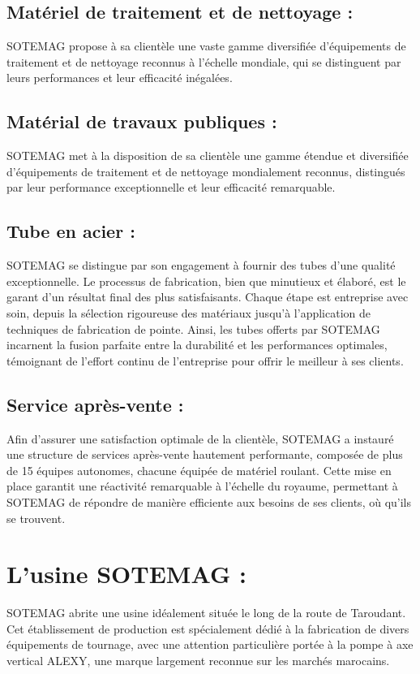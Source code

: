 \documentclass[a4paper, 11pt, openany]{report}
\begin{document}
\subsection{Matériel de traitement et de nettoyage :}
SOTEMAG propose à sa clientèle une vaste gamme diversifiée d'équipements de traitement et de nettoyage reconnus à l'échelle mondiale, qui se distinguent par leurs performances et leur efficacité inégalées.

\subsection{Matérial de travaux publiques :}
SOTEMAG met à la disposition de sa clientèle une gamme étendue et diversifiée d'équipements de traitement et de nettoyage mondialement reconnus, distingués par leur performance exceptionnelle et leur efficacité remarquable.

\subsection{Tube en acier :}
SOTEMAG se distingue par son engagement à fournir des tubes d'une qualité exceptionnelle. Le processus de fabrication, bien que minutieux et élaboré, est le garant d'un résultat final des plus satisfaisants. Chaque étape est entreprise avec soin, depuis la sélection rigoureuse des matériaux jusqu'à l'application de techniques de fabrication de pointe. Ainsi, les tubes offerts par SOTEMAG incarnent la fusion parfaite entre la durabilité et les performances optimales, témoignant de l'effort continu de l'entreprise pour offrir le meilleur à ses clients.

\subsection{Service après-vente :}
Afin d'assurer une satisfaction optimale de la clientèle, SOTEMAG a instauré une structure de services après-vente hautement performante, composée de plus de 15 équipes autonomes, chacune équipée de matériel roulant. Cette mise en place garantit une réactivité remarquable à l'échelle du royaume, permettant à SOTEMAG de répondre de manière efficiente aux besoins de ses clients, où qu'ils se trouvent.

\section{L'usine SOTEMAG :}
SOTEMAG abrite une usine idéalement située le long de la route de Taroudant. Cet établissement de production est spécialement dédié à la fabrication de divers équipements de tournage, avec une attention particulière portée à la pompe à axe vertical ALEXY, une marque largement reconnue sur les marchés marocains.
\end{document}
